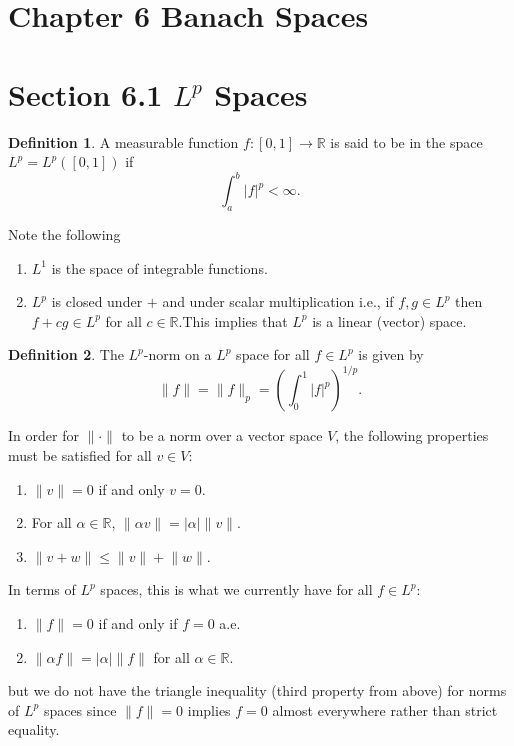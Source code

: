 \documentclass[12pt]{article}
\newcommand{\R}{\mathbb{R}}
\theoremstyle{definition}
\newtheorem*{definition}{Definition}
\begin{document}
\section*{Chapter 6 Banach Spaces}

\section*{Section 6.1 \(L^p\) Spaces}

\begin{definition}
    A measurable function \( f: [0,1] \to \R \) is said to be in the space \( L^p = L^{p}([0,1]) \) if
        \[
            \int_{a}^{b} |f|^{p} < \infty . 
        \]
\end{definition}

Note the following 
    \begin{enumerate}[label = (\arabic{*})]
        \item \( L^1 \) is the space of integrable functions.
        \item \( L^p \) is closed under \( +  \) and under scalar multiplication i.e., if \( f,g \in L^p \) then \( f + cg \in L^p \) for all \( c \in \R \).This implies that \( L^p \) is a linear (vector) space. 
    \end{enumerate}

\begin{definition}
    The \( L^p \)-norm on a \( L^p \) space for all \( f \in L^p \) is given by 
        \[
            \lVert f \rVert = \lVert f \rVert_{p} = \left( \int_{0}^{1} |f|^{p}\right)^{1/p}.
        \]  
\end{definition}

In order for \( \lVert \cdot \rVert \) to be a norm over a vector space \( V \), the following properties must be satisfied for all \( v \in V \):
    \begin{enumerate}[label = (\arabic{*})]
        \item \( \lVert v \rVert = 0 \) if and only \( v = 0 \).
        \item For all \( \alpha \in \R \), \( \lVert \alpha v \rVert =  |\alpha| \lVert v \rVert \).
        \item \( \lVert v + w \rVert \leq \lVert v \rVert + \lVert w \rVert \).
    \end{enumerate}

In terms of \( L^p \) spaces, this is what we currently have for all \( f \in L^p \):
    \begin{enumerate}[label = (\arabic{*})]
        \item \( \lVert f \rVert = 0 \) if and only if \( f = 0 \) a.e.
        \item \( \lVert \alpha f \rVert = |\alpha| \lVert f \rVert \) for all \( \alpha \in \R \).
    \end{enumerate}
but we do not have the triangle inequality (third property from above) for norms of \( L^p \) spaces since \( \lVert f \rVert = 0 \) implies \( f = 0 \) almost everywhere rather than strict equality.
\end{document}
